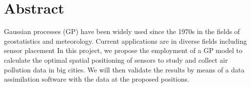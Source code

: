 \documentclass[12pt,twoside]{report}
\date{\today}
\begin{document}



\clearpage{\pagestyle{empty}\cleardoublepage}
\setcounter{page}{1}
\pagestyle{fancy}


\cleardoublepage

\clearpage{\pagestyle{empty}\cleardoublepage}

\chapter*{Abstract}

Gaussian processes (GP) have been widely used since the 1970s in the fields of geostatistics and meteorology. Current applications are in diverse fields including sensor placement
In this project, we propose the employment of a GP model to calculate the optimal spatial positioning of sensors to study and collect air pollution data in big cities. We will then validate the results by means of a data assimilation software with the data at the proposed positions.






\tableofcontents 


\clearpage{\pagestyle{empty}\cleardoublepage}
\setcounter{page}{1}
\fancyhead[LE,RO]{\slshape \rightmark}
\fancyhead[LO,RE]{\slshape \leftmark}

\pagebreak

\listoftodos




 

\end{document}
